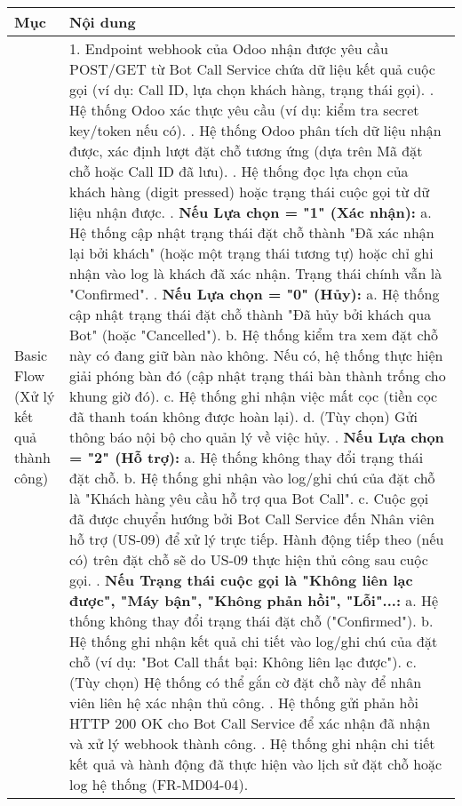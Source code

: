 \begin{longtable}{|m{4cm}|p{11cm}|}
\hline
\textbf{Mục} & \textbf{Nội dung} \\
\hline
Basic Flow (Xử lý kết quả thành công) & 1. Endpoint webhook của Odoo nhận được yêu cầu POST/GET từ Bot Call Service chứa dữ liệu kết quả cuộc gọi (ví dụ: Call ID, lựa chọn khách hàng, trạng thái gọi). \newline 2. Hệ thống Odoo xác thực yêu cầu (ví dụ: kiểm tra secret key/token nếu có). \newline 3. Hệ thống Odoo phân tích dữ liệu nhận được, xác định lượt đặt chỗ tương ứng (dựa trên Mã đặt chỗ hoặc Call ID đã lưu). \newline 4. Hệ thống đọc lựa chọn của khách hàng (digit pressed) hoặc trạng thái cuộc gọi từ dữ liệu nhận được. \newline 5. \textbf{Nếu Lựa chọn = "1" (Xác nhận):} \newline    a. Hệ thống cập nhật trạng thái đặt chỗ thành "Đã xác nhận lại bởi khách" (hoặc một trạng thái tương tự) hoặc chỉ ghi nhận vào log là khách đã xác nhận. Trạng thái chính vẫn là "Confirmed". \newline 6. \textbf{Nếu Lựa chọn = "0" (Hủy):} \newline    a. Hệ thống cập nhật trạng thái đặt chỗ thành "Đã hủy bởi khách qua Bot" (hoặc "Cancelled"). \newline    b. Hệ thống kiểm tra xem đặt chỗ này có đang giữ bàn nào không. Nếu có, hệ thống thực hiện giải phóng bàn đó (cập nhật trạng thái bàn thành trống cho khung giờ đó). \newline    c. Hệ thống ghi nhận việc mất cọc (tiền cọc đã thanh toán không được hoàn lại). \newline    d. (Tùy chọn) Gửi thông báo nội bộ cho quản lý về việc hủy. \newline 7. \textbf{Nếu Lựa chọn = "2" (Hỗ trợ):} \newline    a. Hệ thống không thay đổi trạng thái đặt chỗ. \newline    b. Hệ thống ghi nhận vào log/ghi chú của đặt chỗ là "Khách hàng yêu cầu hỗ trợ qua Bot Call". \newline    c. Cuộc gọi đã được chuyển hướng bởi Bot Call Service đến Nhân viên hỗ trợ (US-09) để xử lý trực tiếp. Hành động tiếp theo (nếu có) trên đặt chỗ sẽ do US-09 thực hiện thủ công sau cuộc gọi. \newline 8. \textbf{Nếu Trạng thái cuộc gọi là "Không liên lạc được", "Máy bận", "Không phản hồi", "Lỗi"...:} \newline    a. Hệ thống không thay đổi trạng thái đặt chỗ ("Confirmed"). \newline    b. Hệ thống ghi nhận kết quả chi tiết vào log/ghi chú của đặt chỗ (ví dụ: "Bot Call thất bại: Không liên lạc được"). \newline    c. (Tùy chọn) Hệ thống có thể gắn cờ đặt chỗ này để nhân viên liên hệ xác nhận thủ công. \newline 9. Hệ thống gửi phản hồi HTTP 200 OK cho Bot Call Service để xác nhận đã nhận và xử lý webhook thành công. \newline 10. Hệ thống ghi nhận chi tiết kết quả và hành động đã thực hiện vào lịch sử đặt chỗ hoặc log hệ thống (FR-MD04-04). \\

\end{longtable}
